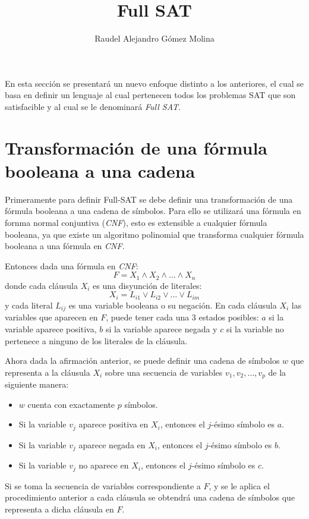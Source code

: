 \documentclass{article}
\title{Full SAT}
\author{Raudel Alejandro Gómez Molina}
\begin{document}
\maketitle

En esta sección se presentará un nuevo enfoque distinto a los anteriores, el cual se basa en definir un lenguaje al cual
pertenecen todos los problemas SAT que son satisfacible y al cual se le denominará \textit{Full SAT}.

\section{Transformación de una fórmula booleana a una cadena}

Primeramente para definir Full-SAT se debe definir una transformación de una fórmula booleana a una cadena de símbolos.
Para ello se utilizará una fórmula en fornma normal conjuntiva (\textit{CNF}), esto es extensible a cualquier fórmula booleana, ya que existe un
algoritmo polinomial que transforma cualquier fórmula booleana a una fórmula en \textit{CNF}.

Entonces  dada una fórmula en \textit{CNF}:
$$F=X_1 \wedge X_2 \wedge \ldots \wedge X_n$$
donde cada cláusula $X_i$ es una disyunción de literales:
$$X_i=L_{i1} \vee L_{i2} \vee \ldots \vee L_{im}$$
y cada literal $L_{ij}$ es una variable booleana o su negación. En cada cláusula $X_i$ las variables que aparecen en $F$,
puede tener cada una 3 estados posibles: $a$ si la variable aparece positiva, $b$ si la variable aparece negada y $c$ si la variable
no pertenece a ninguno de los literales de la cláusula.

Ahora dada la afirmación anterior, se puede definir una cadena de símbolos $w$
que representa a la cláusula $X_i$ sobre una secuencia de variables $v_1,v_2,\ldots,v_p$ de la siguiente manera:

\begin{itemize}
    \item $w$ cuenta con exactamente $p$ símbolos.
    \item Si la variable $v_j$ aparece positiva en $X_i$, entonces el $j$-ésimo símbolo es $a$.
    \item Si la variable $v_j$ aparece negada en $X_i$, entonces el $j$-ésimo símbolo es $b$.
    \item Si la variable $v_j$ no aparece en $X_i$, entonces el $j$-ésimo símbolo es $c$.
\end{itemize}
Si se toma la secuencia de variables correspondiente a $F$, y se le aplica el procedimiento anterior a cada cláusula
se obtendrá una cadena de símbolos que representa a dicha cláusula en $F$.
\end{document}
